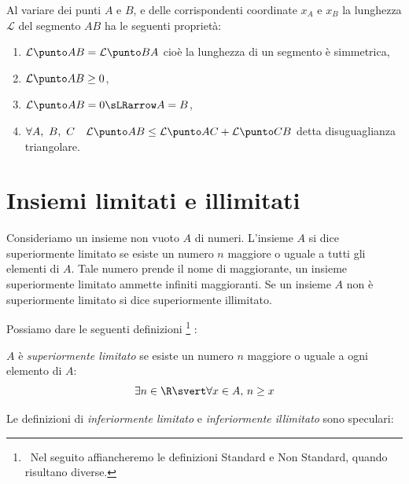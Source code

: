 Al variare dei punti \(A\) e \(B\), e delle corrispondenti coordinate 
\(x_A\) e \(x_B\) la lunghezza \(\mathcal{L}\) del segmento \(AB\) ha le 
seguenti proprietà:
\begin{enumerate}
\item \(\lung{A}{B} =\lung{B}{A}\) 
cioè la lunghezza di un segmento è simmetrica,
\item \(\lung{A}{B} \geq 0\),
\item \(\lung{A}{B} = 0 \sLRarrow A = B\),
\item \(\forall A,~B,~C \quad \lung{A}{B} \leq \lung{A}{C} + \lung{C}{B}\) 
detta disuguaglianza triangolare.
\end{enumerate}

\section{Insiemi limitati e illimitati}
\label{sec:topologiainsiemi}

Consideriamo un insieme non vuoto \(A\) di numeri. 
L'insieme \(A\) si dice superiormente limitato se esiste un numero 
\(n\) maggiore o uguale a tutti gli elementi di \(A\). 
Tale numero prende il nome di maggiorante, un insieme superiormente 
limitato ammette infiniti maggioranti. 
Se un insieme \(A\) non è superiormente limitato si dice superiormente 
illimitato.

Possiamo dare le seguenti definizioni
\footnote{~Nel seguito affiancheremo le definizioni Standard e Non 
Standard, quando risultano diverse.}
:

\begin{newdef}{}{}
\(A\) è \emph{superiormente limitato} se esiste un numero \(n\) 
maggiore o uguale a ogni elemento di \(A\):
\[\exists n \in \R \svert \forall x \in A,\, n \geq x\]
\end{newdef}


\vspace{.5em}
Le definizioni di \emph{inferiormente limitato} e \emph{inferiormente 
illimitato} sono speculari:

